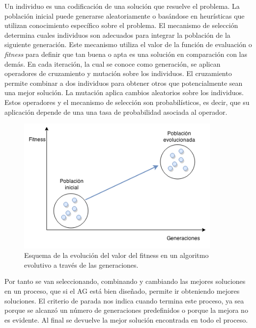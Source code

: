 Un individuo es una codificación de una solución que resuelve el problema. La población inicial puede generarse aleatoriamente o basándose en heurísticas que utilizan conocimiento específico sobre el problema. El mecanismo de selección determina cuales individuos son adecuados para integrar la población de la siguiente generación. Este mecanismo utiliza el valor de la función de evaluación o \emph{fitness} para definir que tan buena o apta es una solución en comparación con las demás. En cada iteración, la cual se conoce como generación, se aplican operadores de cruzamiento y mutación sobre los individuos. El cruzamiento permite combinar a dos individuos para obtener otros que potencialmente sean una mejor solución. La mutación aplica cambios aleatorios sobre los individuos. Estos operadores y el mecanismo de selección son probabilísticos, es decir, que su aplicación depende de una una tasa de probabilidad asociada al operador.


\begin{figure}[ht]
	\centering
	\includegraphics[width=10cm]{Figures/fitness_generaciones}
	\caption[Esquema de la evolución del valor del fitness en un algoritmo evolutivo ]{Esquema de la evolución del valor del fitness en un algoritmo evolutivo a través de las generaciones.}
	\label{fig:fitness_generaciones}
\end{figure}

Por tanto se van seleccionando, combinando y cambiando las mejores soluciones en un proceso, que si el AG está bien diseñado, permite ir obteniendo mejores soluciones.
El criterio de parada nos indica cuando termina este proceso, ya sea porque se alcanzó un número de generaciones predefinidos o porque la mejora no es evidente. Al final se devuelve la mejor solución encontrada en todo el proceso.


